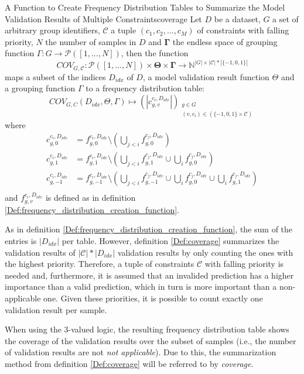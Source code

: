 \begin{Def}{A Function to Create Frequency Distribution Tables to Summarize the Model Validation Results of Multiple Constraints}{coverage}
Let $D$ be a dataset, $G$ a set of arbitrary group identifiers, $\mathcal{C}$ a tuple $(c_1, c_2, ...,c_M)$ of constraints with falling priority, $N$ the number of samples in $D$ and $\mathbf{\Gamma}$ the endless space of grouping function $\Gamma: G \to \mathcal{P}([1,...,N])$, then the function \[COV_{G,\mathcal{C}}: \mathcal{P}([1,...,N]) \times \mathbf{\Theta} \times \mathbf{\Gamma} \to \mathbb{N}^{|G| \times |\mathcal{C}| * |\{-1,0,1\}| }\]
 maps a subset of the indices $D_{idx}$ of $D$, a model validation result function $\Theta$ and a grouping function $\Gamma$ to a frequency distribution table:
 \[COV_{G,C}(D_{idx},\Theta, \Gamma) \mapsto \left(\left|c_{g,v}^{c_i,D_{idx}}\right|\right)_{\substack{g \in G\\ (v,c_i) \in (\{-1,0,1\} \times \mathcal{C}) }}\]
 where 
 \begin{align*}
     c_{g,0}^{c_i,D_{idx}} & = f_{g,0}^{c_i,D_{idx}} \setminus \left(\bigcup_{j < i} f_{g,0}^{c_j,D_{idx}}\right)\\
     c_{g,1}^{c_i,D_{idx}} & = f_{g,1}^{c_i,D_{idx}} \setminus \left(\bigcup_{j < i} f_{g,1}^{c_j,D_{idx}} \cup \bigcup_{i} f_{g,0}^{c_j,D_{idx}}\right)\\
     c_{g,-1}^{c_i,D_{idx}} & = f_{g,-1}^{c_i,D_{idx}} \setminus \left(\bigcup_{j < i} f_{g,-1}^{c_j,D_{idx}} \cup \bigcup_{i} f_{g,0}^{c_j,D_{idx}} \cup \bigcup_{i} f_{g,1}^{c_j,D_{idx}}\right)\\
 \end{align*}
 and $f_{g,v}^{c_i,D_{idx}}$ is defined as in definition \ref{Def:frequency_distribution_creation_function}.
\end{Def}

As in definition \ref{Def:frequency_distribution_creation_function}, the sum of the entries is $|D_{idx}|$ per table. However, definition \ref{Def:coverage} summarizes the validation results of $|\mathcal{C}| * |D_{idx}|$ validation results by only counting the ones with the highest priority. Therefore, a tuple of constraints $\mathcal{C}$ with falling priority is needed and, furthermore, it is assumed that an invalided prediction has a higher importance than a valid prediction, which in turn is more important than a non-applicable one. Given these priorities, it is possible to count exactly one validation result per sample. 

When using the 3-valued logic, the resulting frequency distribution table shows the coverage of the validation results over the subset of samples (i.e., the number of validation results are not \emph{not applicable}). Due to this, the summarization method from definition \ref{Def:coverage} will be referred to by \emph{coverage}.

